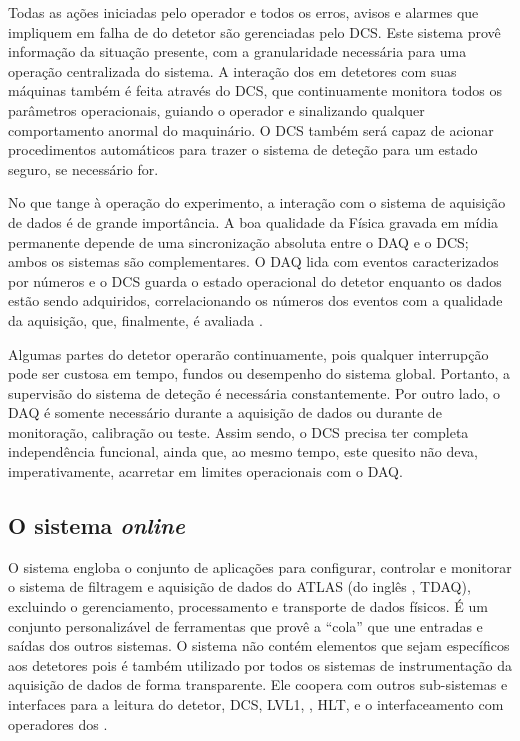 Todas as ações iniciadas pelo operador e todos os erros, avisos e alarmes que
impliquem em falha de  do detetor são gerenciadas pelo DCS. Este
sistema provê informação  da situação presente, com a
granularidade necessária para uma operação centralizada do sistema. A
interação dos  em detetores com suas máquinas também é feita
através do DCS, que continuamente monitora todos os parâmetros operacionais,
guiando o operador e sinalizando qualquer comportamento anormal do
maquinário. O DCS também será capaz de acionar procedimentos automáticos para
trazer o sistema de deteção para um estado seguro, se necessário for.

No que tange à operação do experimento, a interação com o sistema de aquisição
de dados é de grande importância. A boa qualidade da Física gravada em mídia
permanente depende de uma sincronização absoluta entre o DAQ e o DCS; ambos os
sistemas são complementares. O DAQ lida com eventos caracterizados por números
e o DCS guarda o estado operacional do detetor enquanto os dados estão sendo
adquiridos, correlacionando os números dos eventos com a qualidade da
aquisição, que, finalmente, é avaliada .

Algumas partes do detetor operarão continuamente, pois qualquer interrupção
pode ser custosa em tempo, fundos ou desempenho do sistema global. Portanto, a
supervisão do sistema de deteção é necessária constantemente. Por outro lado,
o DAQ é somente necessário durante a aquisição de dados ou durante 
de monitoração, calibração ou teste. Assim sendo, o DCS precisa ter completa
independência funcional, ainda que, ao mesmo tempo, este quesito não deva,
imperativamente, acarretar em limites operacionais com o DAQ.

\subsection{O sistema \textit{online}}
\label{sec:online}

O sistema  engloba o conjunto de aplicações para configurar,
controlar e monitorar o sistema de filtragem e aquisição de dados do ATLAS (do
inglês , TDAQ), excluindo o gerenciamento,
processamento e transporte de dados físicos. É um conjunto personalizável de
ferramentas que provê a ``cola'' que une entradas e saídas dos outros
sistemas. O sistema  não contém elementos que sejam específicos
aos detetores pois é também utilizado por todos os sistemas de instrumentação
da aquisição de dados de forma transparente. Ele coopera com outros
sub-sistemas e interfaces para a leitura do detetor, DCS, LVL1,
, HLT,  e o interfaceamento com operadores dos
.

